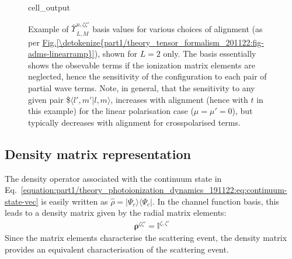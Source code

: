 \documentclass[letterpaper,table,10pt,english]{jupyterBook}
\begin{document}
\begin{figure}[htbp]
\centering
\capstart
\begin{sphinxVerbatimOutput}

\begin{sphinxuseclass}{cell_output}
\noindent{}

\end{sphinxuseclass}\end{sphinxVerbatimOutput}
\caption{Example of \(\bar{\varUpsilon_{}}_{L,M}^{u,\zeta\zeta'}\) basis values for various choices of alignment (as per \hyperref[\detokenize{part1/theory_tensor_formalism_201122:fig-adms-linearramp}]{Fig.\@ \ref{\detokenize{part1/theory_tensor_formalism_201122:fig-adms-linearramp}}}), shown for \(L=2\) only. The basis essentially shows the obsevable terms if the ionization matrix elements are neglected, hence the sensitivity of the configuration to each pair of partial wave terms. Note, in general, that the sensitivity to any given pair \$\(\langle l',m'|l,m\rangle\), increases with alignment (hence with \(t\) in this example) for the linear polarisation case (\(\mu=\mu'=0\)), but typically decreases with alignment for cross\sphinxhyphen{}polarised terms.}\label{\detokenize{part1/theory_tensor_formalism_201122:fig-channelfunc-linearramp}}\end{figure}


\subsection{Density matrix representation}
\label{\detokenize{part1/theory_tensor_formalism_201122:density-matrix-representation}}\label{\detokenize{part1/theory_tensor_formalism_201122:sec-density-mat-basic}}
\sphinxAtStartPar
The density operator associated with the continuum state in
Eq. \eqref{equation:part1/theory_photoionization_dynamics_191122:eq:continuum-state-vec} is easily written as \(\hat{\rho}=|\Psi_c\rangle\langle\Psi_c|\). In the channel function basis, this leads to a density matrix given by the radial matrix
elements:
\begin{equation}\label{equation:part1/theory_tensor_formalism_201122:eqn:radial-density-mat}
\begin{split}\boldsymbol{\rho}^{\zeta\zeta'} = \mathbb{I}^{\zeta,\zeta'}
\end{split}
\end{equation}
\sphinxAtStartPar
Since the matrix elements characterise the scattering event, the density matrix provides an equivalent characterisation of the scattering event.
\end{document}
